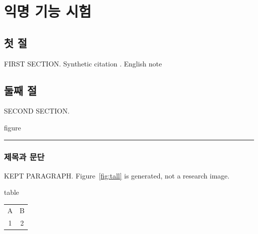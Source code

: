 \chapter{익명 기능 시험}
\section{첫 절}
FIRST SECTION. Synthetic citation \citep{alpha}.
English note
\section{둘째 절}
SECOND SECTION.
\begin{PNUObject}{figure}
\centering\rule{.7\textwidth}{.6\textheight}
\caption{Anonymous tall rectangle}\label{fig:tall}
\end{PNUObject}
\PNUKeepHeading[6\baselineskip]
\subsection{제목과 문단}
KEPT PARAGRAPH. Figure~\ref{fig:tall} is generated, not a research image.
\begin{PNUObject}{table}
\centering\caption{Anonymous small table}
\begin{tabular}{cc}A&B\\1&2\end{tabular}
\end{PNUObject}
